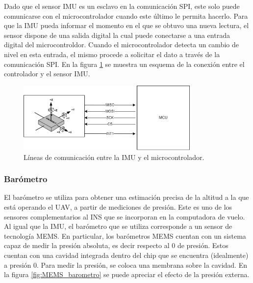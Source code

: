 Dado que el sensor IMU es un esclavo en la comunicación SPI, este solo puede comunicarse con el microcontrolador cuando este último le permita hacerlo. Para que la IMU pueda informar el momento en el que se obtuvo una nueva lectura, el sensor dispone de una salida digital la cual puede conectarse a una entrada digital del microcontroldor. Cuando el microcontrolador detecta un cambio de nivel en esta entrada, el mismo procede a solicitar el dato a través de la comunicación SPI. En la figura \ref{fig:IMU_SPI} se muestra un esquema de la conexión entre el controlador y el sensor IMU.

\begin{figure}[H]
    \centering
    \includegraphics[width=0.8\textwidth]{img/IMU_SPI.png}
    \caption{Líneas de comunicación entre la IMU y el microcontrolador.}
    \label{fig:IMU_SPI}    
\end{figure}

\subsubsection{Barómetro}

El barómetro se utiliza para obtener una estimación precisa de la altitud a la que está operando el UAV, a partir de mediciones de presión. Este es uno de los sensores complementarios al INS que se incorporan en la computadora de vuelo. Al igual que la IMU, el barómetro que se utiliza corresponde a un sensor de tecnología MEMS. En particular, los barómetros MEMS cuentan con un sistema capaz de medir la presión absoluta, es decir respecto al 0 de presión. Estos cuentan con una cavidad integrada dentro del chip que se encuentra (idealmente) a presión 0. %
Para medir la presión, se coloca una membrana sobre la cavidad. En la figura \ref{fig:MEMS_barometro} se puede apreciar el efecto de la presión externa. 

